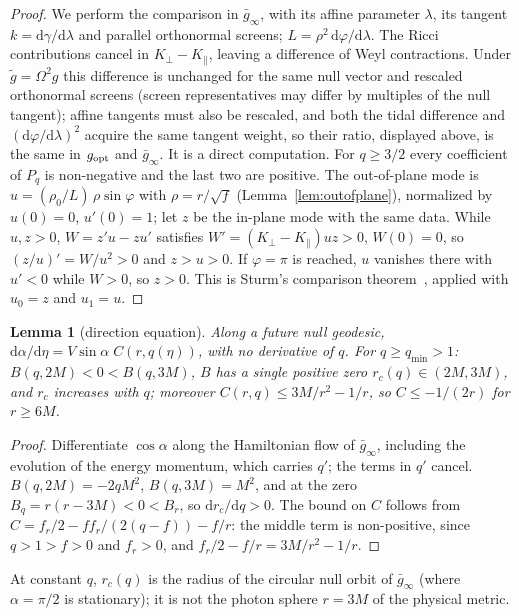 \documentclass[aip,jmp,amsmath,amssymb,reprint]{revtex4-2}
\newcommand{\dd}{\mathrm{d}}
\newcommand{\gopt}{g_{\rm opt}}
\theoremstyle{plain}
\newtheorem{lemma}[proposition]{Lemma}
\theoremstyle{definition}
\begin{document}
\begin{proof}
We perform the comparison in $\bar g_\infty$, with its affine parameter $\lambda$, its tangent
$k=\dd\gamma/\dd\lambda$ and parallel orthonormal screens; $L=\rho^2\,\dd\varphi/\dd\lambda$. The Ricci
contributions cancel in $K_\perp-K_\parallel$, leaving a difference of Weyl contractions. Under
$\tilde g=\Omega^2g$ this difference is unchanged for the same null vector and rescaled orthonormal
screens (screen representatives may differ by multiples of the null tangent); affine tangents
must also be rescaled, and both the tidal difference and $(\dd\varphi/\dd\lambda)^2$ acquire the
same tangent weight, so their ratio, displayed above, is the same in $\gopt$ and $\bar g_\infty$.
It is a direct computation. For $q\ge3/2$ every coefficient of $P_q$ is non-negative and
the last two are positive. The out-of-plane mode is $u=(\rho_0/L)\,\rho\sin\varphi$ with
$\rho=r/\sqrt f$ (Lemma~\ref{lem:outofplane}), normalized by $u(0)=0$, $u'(0)=1$; let $z$ be the
in-plane mode with the same data. While $u,z>0$, $W=z'u-zu'$ satisfies
$W'=(K_\perp-K_\parallel)uz>0$, $W(0)=0$, so $(z/u)'=W/u^2>0$ and $z>u>0$. If $\varphi=\pi$ is reached,
$u$ vanishes there with $u'<0$ while $W>0$, so $z>0$. This is Sturm's comparison
theorem~\cite[Theorem~5.20]{Teschl}, applied with $u_0=z$ and $u_1=u$.
\end{proof}

\begin{lemma}[direction equation]\label{lem:tk-direction}
Along a future null geodesic, $\dd\alpha/\dd\eta=V\sin\alpha\;C(r,q(\eta))$, with no derivative of $q$.
For $q\ge q_{\min}>1$: $B(q,2M)<0<B(q,3M)$, $B$ has a single positive zero $r_c(q)\in(2M,3M)$, and
$r_c$ increases with $q$; moreover $C(r,q)\le3M/r^2-1/r$, so $C\le-1/(2r)$ for $r\ge6M$.
\end{lemma}

\begin{proof}
Differentiate $\cos\alpha$ along the Hamiltonian flow of $\bar g_\infty$, including the evolution
of the energy momentum, which carries $q'$; the terms in $q'$ cancel. $B(q,2M)=-2qM^2$,
$B(q,3M)=M^2$, and at the zero $B_q=r(r-3M)<0<B_r$, so $\dd r_c/\dd q>0$. The bound on $C$ follows
from $C=f_r/2-ff_r/(2(q-f))-f/r$: the middle term is non-positive, since $q>1>f>0$ and $f_r>0$, and
$f_r/2-f/r=3M/r^2-1/r$.
\end{proof}

At constant $q$, $r_c(q)$ is the radius of the circular null orbit of $\bar g_\infty$ (where
$\alpha=\pi/2$ is stationary); it is not the photon sphere $r=3M$ of the physical metric.
\end{document}
